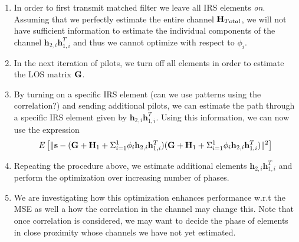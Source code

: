 \documentclass[12pt,a4paper]{report}
\begin{document}
\begin{enumerate}
\item
	In order to first transmit matched filter we leave all IRS elements \emph{on}. Assuming that we perfectly estimate the entire channel $\mathbf{H}_{Total}$, we will not have sufficient information to estimate the individual components of the channel $\mathbf{h}_{2,i}\mathbf{h}^T_{1,i}$ and thus we cannot optimize with respect to $\phi_i $.
\item
	In the next iteration of pilots, we turn off all elements in order to estimate the LOS matrix $\mathbf{G} $.
\item
	By turning on a specific IRS element (can we use patterns using the correlation?) and sending additional pilots, we can estimate 
	the path through a specific IRS element given by $\mathbf{h}_{2,i}\mathbf{h}^T_{1,i}$.
	Using this information, we can now use the expression 
	\begin{equation}
E\left[\|  \mathbf{s} - (\mathbf{G} +  \mathbf{H}_1 + \Sigma_{i=1}^{1} \phi_i \mathbf{h}_{2,i}\mathbf{h}^T_{1,i})(\mathbf{G} +  \mathbf{H}_1 + \Sigma_{i=1}^{1} \phi_i \mathbf{h}_{2,i}\mathbf{h}^T_{1,i}) \|^2 \right]
\end{equation}
	\item
		Repeating the procedure above, we estimate additional elements $\mathbf{h}_{2,i}\mathbf{h}^T_{1,i}$ and perform the optimization over increasing number of phases.
	\item 
		We are investigating how this optimization enhances performance w.r.t the MSE as well a how the correlation in the channel may change this. 
		Note that once correlation is considered, we may want to decide the phase of elements in close proximity whose channels we have not yet estimated.
\end{enumerate}
\end{document}

